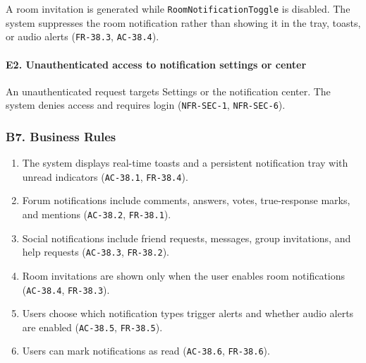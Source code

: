 \documentclass[12pt]{article}
\begin{document}
A room invitation is generated while \texttt{RoomNotificationToggle} is disabled. The system suppresses the room notification rather than showing it in the tray, toasts, or audio alerts (\texttt{FR-38.3}, \texttt{AC-38.4}).
\par\medskip

\hypertarget{sec:e2-unauthenticated-access-to-notification-settings-or-center}{}
\paragraph*{E2. Unauthenticated access to notification settings or center}
\par\medskip

An unauthenticated request targets Settings or the notification center. The system denies access and requires login (\texttt{NFR-SEC-1}, \texttt{NFR-SEC-6}).
\par\medskip

\hypertarget{sec:b7-business-rules}{}
\subsubsection*{B7. Business Rules}
\par\medskip

\begin{enumerate}
\item The system displays real-time toasts and a persistent notification tray with unread indicators (\texttt{AC-38.1}, \texttt{FR-38.4}).
\item Forum notifications include comments, answers, votes, true-response marks, and mentions (\texttt{AC-38.2}, \texttt{FR-38.1}).
\item Social notifications include friend requests, messages, group invitations, and help requests (\texttt{AC-38.3}, \texttt{FR-38.2}).
\item Room invitations are shown only when the user enables room notifications (\texttt{AC-38.4}, \texttt{FR-38.3}).
\item Users choose which notification types trigger alerts and whether audio alerts are enabled (\texttt{AC-38.5}, \texttt{FR-38.5}).
\item Users can mark notifications as read (\texttt{AC-38.6}, \texttt{FR-38.6}).
\end{enumerate}
\par\medskip

\hypertarget{sec:b8-special-requirements}{}
\end{document}
